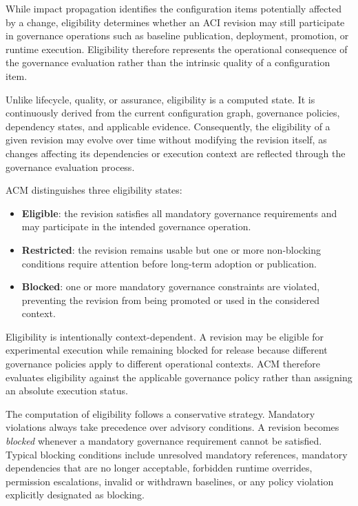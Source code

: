 \documentclass[10pt]{article}
\begin{document}
While impact propagation identifies the configuration items potentially affected by a change, eligibility determines whether an ACI revision may still participate in governance operations such as baseline publication, deployment, promotion, or runtime execution. Eligibility therefore represents the operational consequence of the governance evaluation rather than the intrinsic quality of a configuration item.

Unlike lifecycle, quality, or assurance, eligibility is a computed state. It is continuously derived from the current configuration graph, governance policies, dependency states, and applicable evidence. Consequently, the eligibility of a given revision may evolve over time without modifying the revision itself, as changes affecting its dependencies or execution context are reflected through the governance evaluation process.

ACM distinguishes three eligibility states:

\begin{itemize}
	\item \textbf{Eligible}: the revision satisfies all mandatory governance requirements and may participate in the intended governance operation.
	\item \textbf{Restricted}: the revision remains usable but one or more non-blocking conditions require attention before long-term adoption or publication.
	\item \textbf{Blocked}: one or more mandatory governance constraints are violated, preventing the revision from being promoted or used in the considered context.
\end{itemize}

Eligibility is intentionally context-dependent. A revision may be eligible for experimental execution while remaining blocked for release because different governance policies apply to different operational contexts. ACM therefore evaluates eligibility against the applicable governance policy rather than assigning an absolute execution status.

The computation of eligibility follows a conservative strategy. Mandatory violations always take precedence over advisory conditions. A revision becomes \textit{blocked} whenever a mandatory governance requirement cannot be satisfied. Typical blocking conditions include unresolved mandatory references, mandatory dependencies that are no longer acceptable, forbidden runtime overrides, permission escalations, invalid or withdrawn baselines, or any policy violation explicitly designated as blocking.
\end{document}
